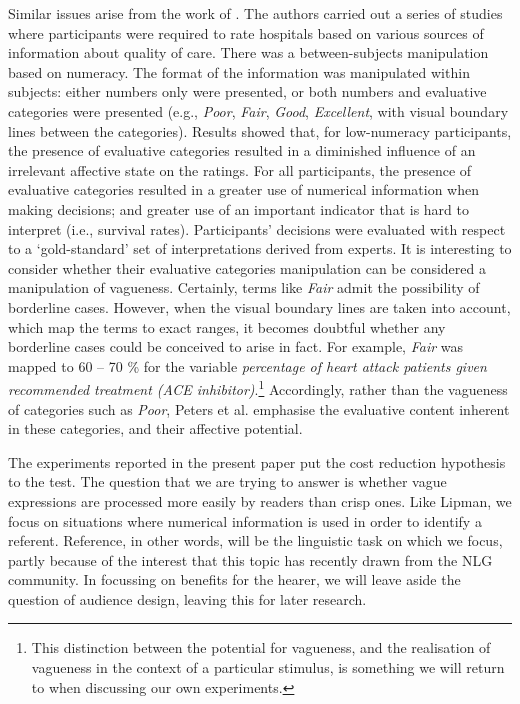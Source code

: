 \documentclass[man,floatmark]{apa}
\begin{document}
Similar issues arise from the work of . The authors carried out a series of studies where participants were required to rate hospitals based on various sources of information about quality of care. There was a between-subjects manipulation based on numeracy. The format of the information was manipulated within subjects: either numbers only were presented, or both numbers and evaluative categories were presented (e.g., \emph{Poor}, \emph{Fair}, \emph{Good}, \emph{Excellent}, with visual boundary lines between the categories). Results showed that, for low-numeracy participants, the presence of evaluative categories resulted in a diminished influence of an irrelevant affective state on the ratings. For all participants, the presence of evaluative categories resulted in a greater use of numerical information when making decisions; and greater use of an important indicator that is hard to interpret (i.e., survival rates). Participants' decisions were evaluated with respect to a `gold-standard' set of interpretations derived from experts. It is interesting to consider whether their evaluative categories manipulation can be considered a manipulation of vagueness. Certainly, terms like \emph{Fair} admit the possibility of borderline cases. However, when the visual boundary lines are taken into account, which map the terms to exact ranges,  it becomes doubtful whether any borderline cases could be conceived to arise in fact. For example,  \emph{Fair} was mapped to 60 -- 70 \% for the variable \emph{percentage of heart attack patients given recommended treatment (ACE inhibitor)}.\footnote{This distinction between the potential for vagueness, and the realisation of vagueness in the context of a particular stimulus, is something we will return to when discussing our own experiments.} Accordingly, rather than the vagueness of categories such as \emph{Poor}, Peters et al. emphasise the evaluative content inherent in these categories, and their affective potential.

The experiments reported in the present paper put the cost reduction hypothesis to the test. The question that we are trying to answer is whether vague expressions are processed more easily by readers than crisp ones. Like Lipman, we focus on situations where numerical information is used in order to identify a referent. Reference, in other words, will be the linguistic task on which we focus, partly because of the interest that this topic has recently drawn from the NLG community.  In focussing on benefits for the hearer, we will leave aside the question of audience design, leaving this for later research.
\end{document}
